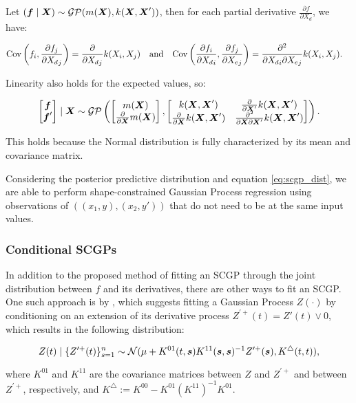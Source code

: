 \begin{property}[Derivative of a GP is a GP]
\label{prop:gpderiv}
    Let \( (\boldsymbol{f} \mid \boldsymbol{X}) \sim \mathcal{GP}(m(\boldsymbol{X}), k(\boldsymbol{X}, \boldsymbol{X}')) \), then for each partial derivative \( \frac{\partial f}{\partial X_d} \), we have:

    \begin{align}
        \operatorname{Cov}\left(f_i, \frac{\partial f_j}{\partial {X_d}_j}\right) &= \frac{\partial}{\partial {X_d}_j} k(X_i, X_j)
        & &\text{and} &
        \operatorname{Cov}\left(\frac{\partial f_i}{\partial {X_d}_i},  \frac{\partial f_j}{\partial {X_e}_j}\right) &= \frac{\partial^2}{\partial {X_d}_i \partial {X_e}_j} k(X_i, X_j).
    \end{align}

    Linearity also holds for the expected values, so:

    \begin{equation}
    \label{eq:scgp_dist}
    \begin{bmatrix} \boldsymbol{f} \\ \boldsymbol{f}' \end{bmatrix} \mid \boldsymbol{X} \sim \mathcal{GP}\left(\begin{bmatrix} m(\boldsymbol{X}) \\  \frac{\partial}{\partial \boldsymbol{X}}m(\boldsymbol{X}) \end{bmatrix}, \begin{bmatrix}
        k(\boldsymbol{X}, \boldsymbol{X}') & \frac{\partial}{\partial \boldsymbol{X}'} k(\boldsymbol{X}, \boldsymbol{X}')\\ 
        \frac{\partial}{\partial \boldsymbol{X}} k(\boldsymbol{X}, \boldsymbol{X}') & \frac{\partial^2}{\partial \boldsymbol{X} \partial \boldsymbol{X}'} k(\boldsymbol{X}, \boldsymbol{X}')
    \end{bmatrix}\right).
    \end{equation}

    This holds because the Normal distribution is fully characterized by its mean and covariance matrix.
\end{property}

Considering the posterior predictive distribution and equation \eqref{eq:scgp_dist}, we are able to perform shape-constrained Gaussian Process regression using observations of \( ((x_1, y), (x_2, y')) \) that do not need to be at the same input values.

\subsubsection{Conditional SCGPs}
\label{sec:scgp_cond}

In addition to the proposed method of fitting an SCGP through the joint distribution between \( f \) and its derivatives, there are other ways to fit an SCGP. One such approach is by \cite{Berger2016}, which suggests fitting a Gaussian Process \( Z(\cdot) \) by conditioning on an extension of its derivative process \( Z^{\prime +}(t) = Z'(t) \lor 0 \), which results in the following distribution:

\begin{equation*}
    Z(t) \mid \{ Z^{\prime +}(t)\}_{s=1}^n \sim \mathcal{N} (\mu + K^{01}(t,\boldsymbol{s})K^{11}(\boldsymbol{s},\boldsymbol{s})^{-1}Z^{\prime +}(\boldsymbol{s}), K^{\triangle}(t,t)),
\end{equation*}

where \( K^{01} \) and \( K^{11} \) are the covariance matrices between \( Z \) and \( Z^{\prime +} \) and between \( Z^{\prime +} \), respectively, and \( K^{\triangle} := K^{00} - K^{01}{(K^{11})}^{-1}K^{01} \).
